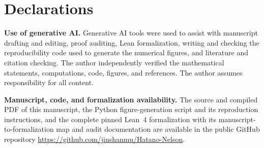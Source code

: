\documentclass[review,hidelinks,onefignum,onetabnum]{siamart251216}
\begin{document}
\section*{Declarations}

\textbf{Use of generative AI.}
Generative AI tools were used to assist with manuscript drafting and editing,
proof auditing, Lean formalization, writing and checking the reproducibility
code used to generate the numerical figures, and literature and citation
checking.  The author independently verified the mathematical statements,
computations, code, figures, and references.  The author assumes
responsibility for all content.

\textbf{Manuscript, code, and formalization availability.}
The source and compiled PDF of this manuscript, the Python figure-generation
script and its reproduction instructions, and the complete pinned Lean~4
formalization with its manuscript-to-formalization map and audit
documentation are available in the public GitHub repository
\url{https://github.com/jinshanmu/Hatano-Nelson}.

\raggedbottom


\end{document}

